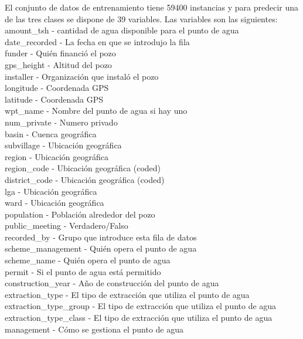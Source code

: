 	El conjunto de datos de entrenamiento tiene 59400 instancias y para predecir una de las tres clases se dispone de 39 variables. Las variables son las siguientes:\\
	
	amount\_tsh - cantidad de agua disponible para el punto de agua \\
	date\_recorded - La fecha en que se introdujo la fila \\				
	funder - Quién financió el pozo \\
	gps\_height - Altitud del pozo \\
	installer - Organización que instaló el pozo \\
	longitude - Coordenada GPS \\
	latitude - Coordenada GPS\\
	wpt\_name - Nombre del punto de agua si hay uno \\
	num\_private - Numero privado\\
	basin - Cuenca geográfica\\
	subvillage - Ubicación geográfica\\
	region - Ubicación geográfica \\
	region\_code - Ubicación geográfica (coded)\\
	district\_code - Ubicación geográfica (coded)\\
	lga - Ubicación geográfica\\
	ward - Ubicación geográfica\\
	population - Población alrededor del pozo\\
	public\_meeting - Verdadero/Falso\\
	recorded\_by - Grupo que introduce esta fila de datos\\
	scheme\_management - Quién opera el punto de agua\\
	scheme\_name - Quién opera el punto de agua\\
	permit - Si el punto de agua está permitido\\
	construction\_year - Año de construcción del punto de agua \\
	extraction\_type - El tipo de extracción que utiliza el punto de agua\\
	extraction\_type\_group - El tipo de extracción que utiliza el punto de agua\\
	extraction\_type\_class - El tipo de extracción que utiliza el punto de agua\\
	management - Cómo se gestiona el punto de agua\\
